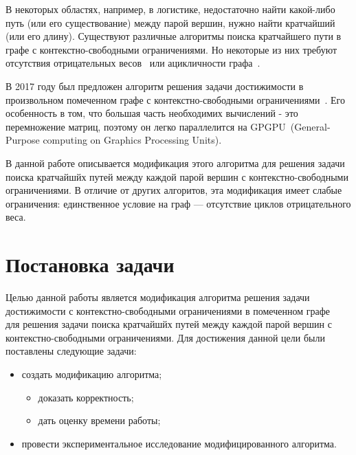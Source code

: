 \documentclass[14pt]{matmex-diploma}
\theoremstyle{definition}
\newtheorem{definition}{Определение}
\begin{document}
    В некоторых областях, например, в логистике, недостаточно найти какой-либо путь (или его существование) между парой вершин, нужно найти кратчайший (или его длину). Существуют различные алгоритмы поиска кратчайшего пути в графе с контекстно-свободными ограничениями. Но некоторые из них требуют отсутствия отрицательных весов~\cite{Barrett} или ацикличности графа~\cite{p2pdyck}.
    
    В 2017 году был предложен алгоритм решения задачи достижимости в произвольном помеченном графе с контекстно-свободными ограничениями~\cite{DBLP:journals/corr/AzimovG17}. Его особенность в том, что большая часть необходимих вычислений - это перемножение матриц, поэтому он легко параллелится на GPGPU~(General-Purpose computing on
Graphics Processing Units). 
    
    В данной работе описывается модификация этого алгоритма для решения задачи поиска кратчайшйх путей между каждой парой вершин с контекстно-свободными ограничениями. В отличие от других алгоритов, эта модификация имеет слабые ограничения: единственное условие на граф --- отсутствие циклов отрицательного веса.
    
    
    
\section{Постановка задачи}
    Целью данной работы является модификация алгоритма решения задачи достижимости с контекстно-свободными ограничениями в помеченном графе~\cite{DBLP:journals/corr/AzimovG17} для решения задачи поиска кратчайшйх путей между каждой парой вершин с контекстно-свободными ограничениями. Для достижения данной цели были поставлены следующие задачи:
    \begin{itemize}
        \item создать модификацию алгоритма;
        \begin{itemize}
            \item доказать корректность;
            \item дать оценку времени работы;
        \end{itemize}
        \item провести экспериментальное исследование модифицированного алгоритма.
    \end{itemize}
\end{document}
